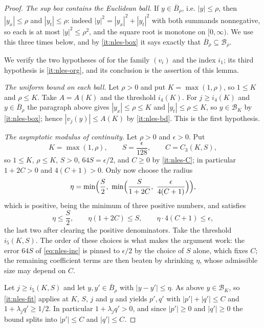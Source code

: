 \begin{proof}
\emph{The sup box contains the Euclidean ball.} If $y\in\overline B_\rho$, i.e.
$|y|\le\rho$, then $|y_x|\le\rho$ and $|y_t|\le\rho$: indeed
$|y|^2=|y_x|^2+|y_t|^2$ with both summands nonnegative, so each is at most
$|y|^2\le\rho^2$, and the square root is monotone on $[0,\infty)$. We use this
three times below, and by \ref{it:nles-box} it says exactly that
$\overline B_\rho\subseteq\mathcal B_\rho$.

We verify the two hypotheses of
 for the family $(v_i)$ and the
index $i_1$; its third hypothesis is \ref{it:nles-org}, and its conclusion is
the assertion of this lemma.

\emph{The uniform bound on each ball.} Let $\rho>0$ and put $K=\max(1,\rho)$,
so $1\le K$ and $\rho\le K$. Take $A=A(K)$ and the threshold $i_4(K)$. For
$j\ge i_4(K)$ and $y\in\overline B_\rho$ the paragraph above gives
$|y_x|\le\rho\le K$ and $|y_t|\le\rho\le K$, so $y\in\mathcal B_K$ by
\ref{it:nles-box}; hence $|v_j(y)|\le A(K)$ by \ref{it:nles-bd}. This is the
first hypothesis.

\emph{The asymptotic modulus of continuity.} Let $\rho>0$ and $\epsilon>0$.
Put
\[
  K=\max(1,\rho),\qquad S=\frac{\epsilon}{128},\qquad C=C_3(K,S),
\]
so $1\le K$, $\rho\le K$, $S>0$, $64S=\epsilon/2$, and $C\ge0$ by
\ref{it:nles-C}; in particular $1+2C>0$ and $4(C+1)>0$. Only now choose the
radius
\[
  \eta=\min\Bigl(\frac S2,\ \min\Bigl(\frac{S}{1+2C},\
    \frac{\epsilon}{4(C+1)}\Bigr)\Bigr),
\]
which is positive, being the minimum of three positive numbers, and satisfies
\begin{equation}\label{eq:nles-eta}
  \eta\le\frac S2,\qquad \eta(1+2C)\le S,\qquad \eta\cdot4(C+1)\le\epsilon,
\end{equation}
the last two after clearing the positive denominators. Take the threshold
$i_5(K,S)$. The order of these choices is what makes the argument work: the
error $64S$ of \eqref{eq:nles-inc} is pinned to $\epsilon/2$ by the choice of
$S$ alone, which fixes $C$; the remaining coefficient terms are then beaten by
shrinking $\eta$, whose admissible size may depend on $C$.

Let $j\ge i_5(K,S)$ and let $y,y'\in\overline B_\rho$ with $|y-y'|\le\eta$.
As above $y\in\mathcal B_K$, so \ref{it:nles-fit} applies at $K$, $S$, $j$ and
$y$ and yields $p',q'$ with $|p'|+|q'|\le C$ and $1+\lambda_jq'\ge1/2$. In
particular $1+\lambda_jq'>0$, and since $|p'|\ge0$ and $|q'|\ge0$ the bound
splits into $|p'|\le C$ and $|q'|\le C$.


\end{proof}
